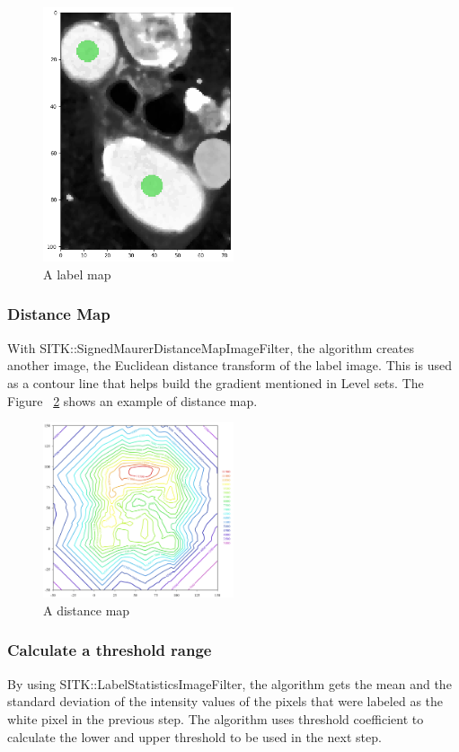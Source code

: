 \begin{figure}[H]
    \centering
    \includegraphics[width=0.5\textwidth]{figures/AGR/label_image.png}
    \caption[A label image]{A label map}
    \label{fig_label_map}
\end{figure}

\subsubsection{Distance Map}
With SITK::SignedMaurerDistanceMapImageFilter, the algorithm creates another image, the Euclidean distance transform of the label image. This is used as a contour line that helps build the gradient mentioned in Level sets. The Figure ~\ref{fig_distance_map} shows an example of distance map.

\begin{figure}[H]
    \centering
    \includegraphics[width=0.5\textwidth]{figures/AGR/Contour2D.png}
    \caption[A distance map]{A distance map}
    \label{fig_distance_map}
\end{figure}


\subsubsection{Calculate a threshold range}
By using SITK::LabelStatisticsImageFilter, the algorithm gets the mean and the standard deviation of the intensity values of the pixels that were labeled as the white pixel in the previous step. The algorithm uses threshold coefficient to calculate the lower and upper threshold to be used in the next step.

